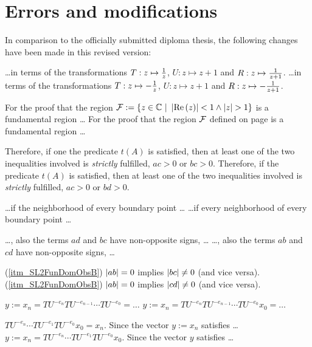 \chapter{Errors and modifications}

In comparison to the officially submitted diploma thesis, the following changes have been made in this revised version:

\begin{description}
{\dots in terms of the transformations $T : z \mapsto \frac{1}{z}$, $U : z \mapsto z+1$ and $R : z \mapsto \frac{1}{z+1}$.}
{\dots in terms of the transformations $T : z \mapsto -\frac{1}{z}$, $U : z \mapsto z+1$ and $R : z \mapsto -\frac{1}{z+1}$.}

{For the proof that the region $\mathcal{F} := \{ z \in \mathbb{C} \ | \ \left|\operatorname{Re}\left(z\right)\right| < 1 \land \left|z\right| > 1 \}$ is a fundamental region \dots}
{For the proof that the region $\mathcal{F}$ defined on page \pageref{eqn_PSL2FunDom} is a fundamental region \dots}

{Therefore, if one the predicate $t(A)$ is satisfied, then at least one of the two inequalities involved is \emph{strictly} fulfilled, \ie $ac > 0$ or $bc > 0$.}
{Therefore, if the predicate $t(A)$ is satisfied, then at least one of the two inequalities involved is \emph{strictly} fulfilled, \ie $ac > 0$ or $bd > 0$.}

{\dots if the neighborhood of every boundary point \dots}
{\dots if every neighborhood of every boundary point \dots}

{\dots, \ie also the terms $ad$ and  $bc$ have non-opposite signs, \dots}
{\dots, \ie also the terms $ab$ and $cd$ have non-opposite signs, \dots}

{(\ref{itm_SL2FunDomObsB})\quad
$\left|ab\right| = 0$ implies $\left|bc\right| \ne 0$ (and vice versa).}
{(\ref{itm_SL2FunDomObsB})\quad
$\left|ab\right| = 0$ implies $\left|cd\right| \ne 0$ (and vice versa).}

{$y := x_n = TU^{-e_n} TU^{-e_{n-1}} \cdots TU^{-e_0} = \dots$}
{$y := x_n = TU^{-e_n} TU^{-e_{n-1}} \cdots TU^{-e_0} x_0 = \dots$}

{$TU^{-e_n} \cdots TU^{-e_1} TU^{-e_0} x_0 = x_n.$ \quad Since the vector $y := x_n$ satisfies \dots}
{$y := x_n = TU^{-e_n} \cdots TU^{-e_1} TU^{-e_0} x_0.$ \quad Since the vector $y$ satisfies \dots}


\end{description}

